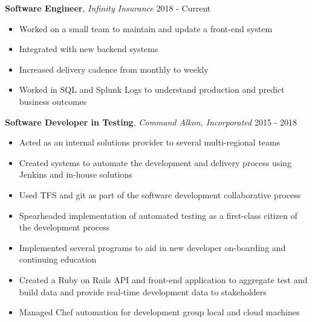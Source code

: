 \documentclass[9pt]{article}
\newenvironment{changemargin}[2]{%
  \begin{list}{}{%
    \setlength{\topsep}{0pt}%
    \setlength{\leftmargin}{#1}%
    \setlength{\rightmargin}{#2}%
    \setlength{\listparindent}{\parindent}%
    \setlength{\itemindent}{\parindent}%
    \setlength{\parsep}{\parskip}%
  }%
  \item[]}{\end{list}
}
\newenvironment{body} {
	\vspace*{-16pt}
	\begin{changemargin}{-0.25in}{-0.5in}
  }	
	{\end{changemargin}
}
\begin{document}
\begin{body}
  \vspace{17pt}
  \textbf{Software Engineer}, \emph{Infinity Insurance} \hfill 2018 - Current \\
  \vspace*{-4pt}
  \begin{itemize} \itemsep -0pt
  \item Worked on a small team to maintain and update a front-end system
  \item Integrated with new backend systems
  \item Increased delivery cadence from monthly to weekly
  \item Worked in SQL and Splunk Logs to understand production and predict business outcomes
  \end{itemize}
  
	\vspace{17pt}
	\textbf{Software Developer in Testing}, \emph{Command Alkon, Incorporated} \hfill 2015 - 2018 \\
	\vspace*{-4pt}
	\begin{itemize} \itemsep -0pt  %
		\item Acted as an internal solutions provider to several multi-regional teams
		\item Created systems to automate the development and delivery process using Jenkins and in-house solutions
		\item Used TFS and git as part of the software development collaborative process
		\item Spearheaded implementation of automated testing as a first-class citizen of the development process
		\item Implemented several programs to aid in new developer on-boarding and continuing education
		\item Created a Ruby on Rails API and front-end application to aggregate test and build data and provide real-time development data to stakeholders
		\item Managed Chef automation for development group local and cloud machines
	\end{itemize}
	\vspace{17pt}


\end{body}
\end{document}
